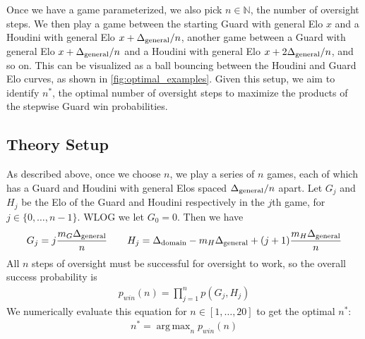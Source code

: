 \documentclass{article}
\DeclareMathOperator*{\argmax}{arg\,max}
\begin{document}
Once we have a game parameterized, we also pick $n \in \mathbb{N}$, the number of oversight steps. We then play a game between the starting Guard with general Elo $x$ and a Houdini with general Elo $x + \Delta_{\rm general} / n$, another game between a Guard with general Elo $x + \Delta_{\rm general} / n$ and a Houdini with general Elo $x + 2\Delta_{\rm general} / n$, and so on. This can be visualized as a ball bouncing between the Houdini and Guard Elo curves, as shown in \cref{fig:optimal_examples}. 
Given this setup, we aim to identify $n^*$, the optimal number of oversight steps to maximize the products of the stepwise Guard win probabilities.%




\subsection{Theory Setup}

As described above, once we choose $n$, we play a series of $n$ games, each of which has a Guard and Houdini with general Elos spaced $\Delta_{\rm general} / n$ apart. Let $G_j$ and $H_j$ be the Elo of the Guard and Houdini respectively in the $j$th game, for $j \in \{0, \ldots, n - 1\}$. 
WLOG we let $G_0 = 0$. Then we have
\begin{align}
    G_j =  j\frac{m_G\Delta_{\rm general}}{n}  \qquad H_j = \Delta_{\rm domain} - m_H \Delta_{\rm general} + (j + 1)\frac{m_H \Delta_{\rm general} }{n}  
\end{align}
All $n$ steps of oversight must be successful for oversight to work, so the overall success probability is
\begin{align}
    \label{eqn:pwin}
    p_{win}(n) = \prod_{j=1}^n p(G_j, H_j)
\end{align}
We numerically evaluate this equation for $n \in [1, \ldots, 20]$ to get the optimal $n^*$:
\begin{align}
    \label{eqn:argmax}
    n^* = \argmax_{n} p_{win}(n)
\end{align}
\end{document}
